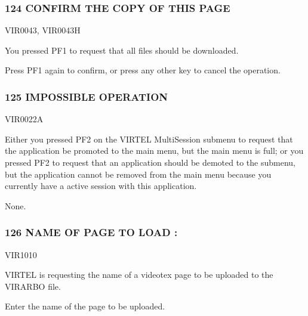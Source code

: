 \documentclass[letterpaper,10pt,english]{sphinxmanual}
\begin{document}
\subsubsection{124 CONFIRM THE COPY OF THIS PAGE}
\label{\detokenize{messages:confirm-the-copy-of-this-page}}\begin{description}
\sphinxAtStartPar
VIR0043, VIR0043H

\sphinxAtStartPar
You pressed PF1 to request that all files should be downloaded.

\sphinxAtStartPar
Press PF1 again to confirm, or press any other key to cancel the operation.

\end{description}


\subsubsection{125 IMPOSSIBLE OPERATION}
\label{\detokenize{messages:impossible-operation}}\begin{description}
\sphinxAtStartPar
VIR0022A

\sphinxAtStartPar
Either you pressed PF2 on the VIRTEL Multi\sphinxhyphen{}Session sub\sphinxhyphen{}menu to request that the application be promoted to the main menu, but the main menu is full; or you pressed PF2 to request that an application should be demoted to the sub\sphinxhyphen{}menu, but the application cannot be removed from the main menu because you currently have a active session with this application.

\sphinxAtStartPar
None.

\end{description}


\subsubsection{126 NAME OF PAGE TO LOAD :}
\label{\detokenize{messages:name-of-page-to-load}}\begin{description}
\sphinxAtStartPar
VIR1010

\sphinxAtStartPar
VIRTEL is requesting the name of a videotex page to be uploaded to the VIRARBO file.

\sphinxAtStartPar
Enter the name of the page to be uploaded.

\end{description}
\end{document}
